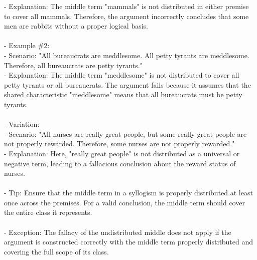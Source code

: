 \documentclass[a4paper,12pt,single,pdftex]{scrartcl}
\begin{document}
    
        - Explanation: The middle term "mammals" is not distributed in either premise to cover all mammals. Therefore, the argument incorrectly concludes that some men are rabbits without a proper logical basis.
    \\

    
      
    \\

    
      - Example \#2:
    \\

    
        - Scenario: "All bureaucrats are meddlesome. All petty tyrants are meddlesome. Therefore, all bureaucrats are petty tyrants."
    \\

    
        - Explanation: The middle term "meddlesome" is not distributed to cover all petty tyrants or all bureaucrats. The argument fails because it assumes that the shared characteristic "meddlesome" means that all bureaucrats must be petty tyrants.
    \\

    
      
    \\

    
      - Variation:
    \\

    
        - Scenario: "All nurses are really great people, but some really great people are not properly rewarded. Therefore, some nurses are not properly rewarded."
    \\

    
        - Explanation: Here, "really great people" is not distributed as a universal or negative term, leading to a fallacious conclusion about the reward status of nurses.
    \\

    
      
    \\

    
      - Tip: Ensure that the middle term in a syllogism is properly distributed at least once across the premises. For a valid conclusion, the middle term should cover the entire class it represents.
    \\

    
      
    \\

    
      - Exception: The fallacy of the undistributed middle does not apply if the argument is constructed correctly with the middle term properly distributed and covering the full scope of its class.
    \\
\end{document}
